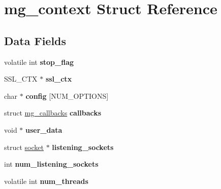 \hypertarget{structmg__context}{}\section{mg\+\_\+context Struct Reference}
\label{structmg__context}
\subsection*{Data Fields}
\begin{DoxyCompactItemize}
\item 
\mbox{\label{structmg__context_a262e7e3079712367f829427934838e7b}} 
volatile int {\bfseries stop\+\_\+flag}
\item 
\mbox{\label{structmg__context_a463677406a1b4dd5e5a6a9df427800ce}} 
S\+S\+L\+\_\+\+C\+TX $\ast$ {\bfseries ssl\+\_\+ctx}
\item 
\mbox{\label{structmg__context_adf904c7ddd0214498d77f9ba70262dce}} 
char $\ast$ {\bfseries config} \mbox{[}N\+U\+M\+\_\+\+O\+P\+T\+I\+O\+NS\mbox{]}
\item 
\mbox{\label{structmg__context_a96ed28bfd364cf0b9b556e365a3b780d}} 
struct \mbox{\hyperlink{structmg__callbacks}{mg\+\_\+callbacks}} {\bfseries callbacks}
\item 
\mbox{\label{structmg__context_a73a26dd1c9abead88b40b2d226ad9f28}} 
void $\ast$ {\bfseries user\+\_\+data}
\item 
\mbox{\label{structmg__context_a8639456185dda0c46dc6131f814a9d3f}} 
struct \mbox{\hyperlink{structsocket}{socket}} $\ast$ {\bfseries listening\+\_\+sockets}
\item 
\mbox{\label{structmg__context_a39d0bfea1640cc84143414658900f32b}} 
int {\bfseries num\+\_\+listening\+\_\+sockets}
\item 
\mbox{\label{structmg__context_a81b6277ccbae09b5229824d3e871348f}} 
volatile int {\bfseries num\+\_\+threads}
\item 
\mbox{\label{structmg__context_ae4d63e22f24744ca80804d96c2936dc1}} 

\end{DoxyCompactItemize}
